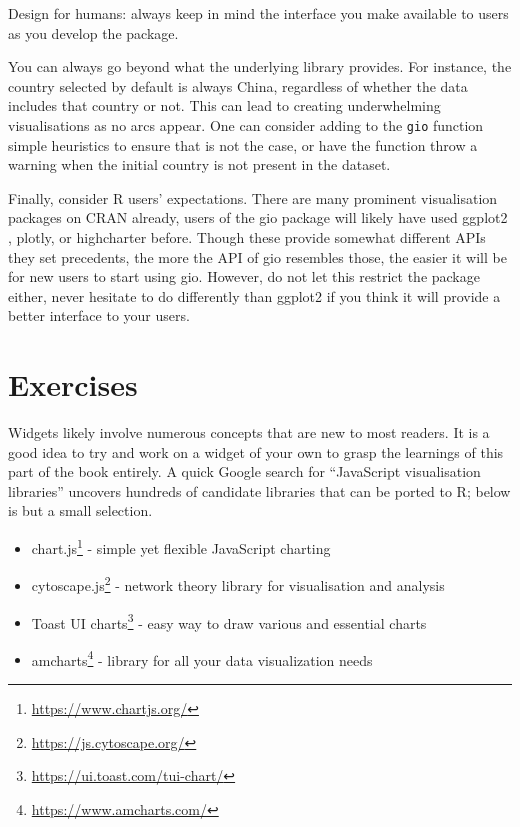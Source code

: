 \documentclass[10pt,]{krantz}
\makeatletter
\providecommand{\tightlist}{%
  \setlength{\itemsep}{0pt}\setlength{\parskip}{0pt}}
\renewcommand{\href}[2]{#2\footnote{\url{#1}}}
\newenvironment{kframe}{%
\medskip{}
\setlength{\fboxsep}{.8em}
 \def\at@end@of@kframe{}%
 \ifinner\ifhmode%
  \def\at@end@of@kframe{\end{minipage}}%
  \begin{minipage}{\columnwidth}%
 \fi\fi%
 \def\FrameCommand##1{\hskip\@totalleftmargin \hskip-\fboxsep
 \colorbox{shadecolor}{##1}\hskip-\fboxsep
     \hskip-\linewidth \hskip-\@totalleftmargin \hskip\columnwidth}%
 \MakeFramed {\advance\hsize-\width
   \@totalleftmargin\z@ \linewidth\hsize
   \@setminipage}}%
 {\par\unskip\endMakeFramed%
 \at@end@of@kframe}
\newenvironment{rmdblock}[1]
  {
  \begin{itemize}
  \renewcommand{\labelitemi}{
    \raisebox{-.7\height}[0pt][0pt]{
      {\setkeys{Gin}{width=3em,keepaspectratio}\texttt{[image: images/\#1]}}
    }
  }
  \setlength{\fboxsep}{1em}
  \begin{kframe}
  \item
  }
  {
  \end{kframe}
  \end{itemize}
  }
\newenvironment{rmdnote}
  {\begin{rmdblock}{note}}
  {\end{rmdblock}}
\makeatother
\begin{document}
\begin{rmdnote}
Design for humans: always keep in mind the interface you make available
to users as you develop the package.
\end{rmdnote}

You can always go beyond what the underlying library provides. For instance, the country selected by default is always China, regardless of whether the data includes that country or not. This can lead to creating underwhelming visualisations as no arcs appear. One can consider adding to the \texttt{gio} function simple heuristics to ensure that is not the case, or have the function throw a warning when the initial country is not present in the dataset.

Finally, consider R users' expectations. There are many prominent visualisation packages on CRAN already, users of the gio package will likely have used ggplot2 \citep{R-ggplot2}, plotly, or highcharter before. Though these provide somewhat different APIs they set precedents, the more the API of gio resembles those, the easier it will be for new users to start using gio. However, do not let this restrict the package either, never hesitate to do differently than ggplot2 if you think it will provide a better interface to your users.

\hypertarget{widgets-final-exercises}{%
\section{Exercises}\label{widgets-final-exercises}}

Widgets likely involve numerous concepts that are new to most readers. It is a good idea to try and work on a widget of your own to grasp the learnings of this part of the book entirely. A quick Google search for ``JavaScript visualisation libraries'' uncovers hundreds of candidate libraries that can be ported to R; below is but a small selection.

\begin{itemize}
\tightlist
\item
  \href{https://www.chartjs.org/}{chart.js} - simple yet flexible JavaScript charting
\item
  \href{https://js.cytoscape.org/}{cytoscape.js} - network theory library for visualisation and analysis
\item
  \href{https://ui.toast.com/tui-chart/}{Toast UI charts} - easy way to draw various and essential charts
\item
  \href{https://www.amcharts.com/}{amcharts} - library for all your data visualization needs
\end{itemize}
\end{document}
